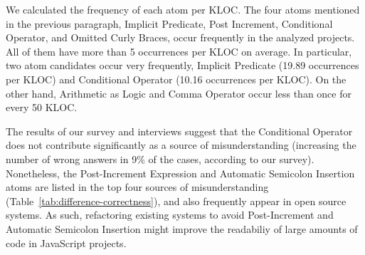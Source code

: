 We calculated the frequency of each atom per KLOC.
The four atoms mentioned in the previous paragraph,
 Implicit Predicate, Post Increment, Conditional Operator, and Omitted Curly Braces, occur frequently in the analyzed projects. All of them have more than 5 occurrences per KLOC on average. In particular, two atom candidates occur very frequently, Implicit Predicate (19.89 occurrences per KLOC) and Conditional Operator (10.16 occurrences per KLOC). On the other hand, Arithmetic as Logic and Comma Operator occur less than once for every 50 KLOC. 


The results of our survey and interviews suggest that the Conditional Operator does not contribute significantly as a source of misunderstanding (increasing the number of wrong answers in 9\% of the cases, according to our survey). Nonetheless, the Post-Increment Expression and Automatic Semicolon Insertion atoms are listed in the top four sources of misunderstanding  (Table~\ref{tab:difference-correctness}), and also frequently appear in open source systems. As such, refactoring existing systems to avoid Post-Increment and Automatic Semicolon Insertion might improve the readabiliy of large amounts of code in JavaScript projects. 



